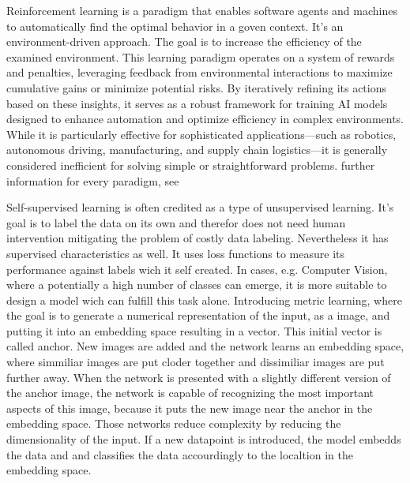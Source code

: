 Reinforcement learning is a paradigm that enables software agents and machines to automatically find the optimal behavior in a goven context.
It's an environment-driven approach.
The goal is to increase the efficiency of the examined environment. 
This learning paradigm operates on a system of rewards and penalties, leveraging feedback from environmental interactions to maximize cumulative gains or minimize potential risks. 
By iteratively refining its actions based on these insights, it serves as a robust framework for training AI models designed to enhance automation and optimize efficiency in complex environments. 
While it is particularly effective for sophisticated applications—such as robotics, autonomous driving, manufacturing, and supply chain logistics—it is generally considered inefficient for solving simple or straightforward problems.
\citep[p.4]{sarker2021machine}
further information for every paradigm, see \citep{emmert2022taxonomy}


Self-supervised learning is often credited as a type of unsupervised learning.
It's goal is to label the data on its own and therefor does not need human intervention mitigating the problem of costly data labeling.
Nevertheless it has supervised characteristics as well.
It uses loss functions to measure its performance against labels wich it self created.
In cases, e.g. Computer Vision, where a potentially a high number of classes can emerge, it is more suitable to design a model wich can fulfill this task alone. 
Introducing metric learning, where the goal is to generate a numerical representation of the input, as a image, and putting it into an embedding space resulting in a vector.
This initial vector is called anchor. New images are added and the network learns an embedding space, where simmiliar images are put cloder together and dissimiliar 
images are put further away. When the network is presented with a slightly different version of the anchor image, the network is capable of recognizing the most important 
aspects of this image, because it puts the new image near the anchor in the embedding space.  
Those networks reduce complexity by reducing the dimensionality of the input.
If a new datapoint is introduced, the model embedds the data and and classifies the data accourdingly to the localtion in the embedding space. 
\citep{raina2007self}

